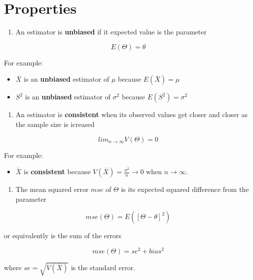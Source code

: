 \documentclass[
]{book}
\providecommand{\tightlist}{%
  \setlength{\itemsep}{0pt}\setlength{\parskip}{0pt}}
\begin{document}
\hypertarget{properties}{%
\section{Properties}\label{properties}}

\begin{enumerate}
\def\labelenumi{\arabic{enumi}.}
\tightlist
\item
  An estimator is \textbf{unbiased} if it expected value is the parameter
\end{enumerate}

\[E(\Theta)=\theta\]

For example:

\begin{itemize}
\item
  \(\bar{X}\) is an \textbf{unbiased} estimator of \(\mu\) because \(E(\bar{X})=\mu\)
\item
  \(S^2\) is an \textbf{unbiased} estimator of \(\sigma^2\) because \(E(S^2)=\sigma^2\)
\end{itemize}

\begin{enumerate}
\def\labelenumi{\arabic{enumi}.}
\setcounter{enumi}{1}
\tightlist
\item
  An estimator is \textbf{consistent} when its observed values get closer and closer as the sample size is icreased
\end{enumerate}

\[lim_{n\rightarrow \infty} V(\Theta) = 0\]

For example:

\begin{itemize}
\tightlist
\item
  \(\bar{X}\) is \textbf{consistent} because \(V(\bar{X})=\frac{\sigma^2}{n}\rightarrow 0\) when \(n \rightarrow \infty\).
\end{itemize}

\begin{enumerate}
\def\labelenumi{\arabic{enumi}.}
\setcounter{enumi}{2}
\tightlist
\item
  The mean squared error \(mse\) of \(\Theta\) is its expected squared difference from the parameter
\end{enumerate}

\[mse(\Theta)=E([\Theta - \theta]^2)\]

or equivalently is the sum of the errors

\[mse(\Theta)=se^2 + bias^2\]

where \(se=\sqrt{V(\bar{X})}\) is the standard error.
\end{document}
